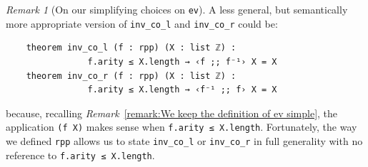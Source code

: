 \documentclass[preprint]{elsarticle}
\theoremstyle{remark}
\newtheorem{remark}{Remark}
\begin{document}
\begin{remark}[On our simplifying choices on {\normalfont \lstinline|ev|}]
\label{remark:On our simplifying choices on ev}
A less general, but semantically more appropriate version of  \lstinline|inv_co_l| and \lstinline|inv_co_r| could be:
\begin{lstlisting}
    theorem inv_co_l (f : rpp) (X : list ℤ) :
                f.arity ≤ X.length → ‹f ;; f⁻¹› X = X
    theorem inv_co_r (f : rpp) (X : list ℤ) :
                f.arity ≤ X.length → ‹f⁻¹ ;; f› X = X
\end{lstlisting}
because, recalling \textit{Remark}~\ref{remark:We keep the definition of ev simple}, the application \lstinline|(f X)| makes sense when \lstinline|f.arity ≤ X.length|.
Fortunately, the way we defined \lstinline|rpp| allows us to state \lstinline|inv_co_l| or \lstinline|inv_co_r| in full generality
with no reference to \lstinline|f.arity ≤ X.length|.
\end{remark}

\end{document}
